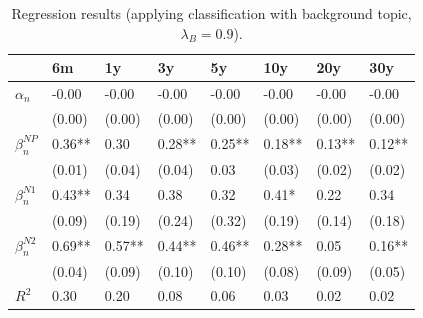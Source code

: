 \documentclass[11pt,a4paper,english,oneside]{book}
\numberwithin{equation}{chapter}
\begin{document}
\begin{table}[h] %
	\centering %
	\begin{tabular}{ p{2cm}  p{1cm} p{1cm} p{1cm} p{1cm} p{1cm} p{1cm} p{1cm} } %
		\toprule %
						& 6m 		& 1y 		& 3y 		& 5y 		& 10y 		& 20y 		& 30y \\
		\midrule %
		$\alpha_n$		& -0.00 	& -0.00 	& -0.00 	& -0.00  	& -0.00 	& -0.00 	& -0.00    \\
						& (0.00) 	& (0.00)  	& (0.00)  	& (0.00) 	& (0.00) 	& (0.00) 	& (0.00)   \\
		$\beta_n^{NP}$	&  0.36**	&   0.30	& 0.28**	&  0.25**	&  0.18**	&  0.13**	& 0.12**\\
						& (0.01)	&  (0.04)	& (0.04)	&  0.03		&  (0.03)	&  (0.02)	& (0.02) \\
		$\beta_n^{N1}$	& 0.43**	&  0.34		&  0.38		&  0.32		&  0.41*	& 0.22		& 0.34  \\
						&  (0.09)	&  (0.19)	& (0.24)	& (0.32)	&  (0.19)	& (0.14)	& (0.18)  \\
		$\beta_n^{N2}$	&  0.69**	&  0.57**	&  0.44**	&  0.46**	&  0.28**	& 0.05		& 0.16**\\
						& 	(0.04)	&  (0.09)	& (0.10)	&  (0.10)	& (0.08)	& (0.09)	& (0.05) \\
		$R^2$			&  0.30		& 0.20		& 0.08		&  0.06		&  0.03		&  0.02		&  0.02  \\
		
		\bottomrule %
	\end{tabular}
	\caption{Regression results (applying classification with background topic, $\lambda_B=0.9$).} %
	\label{tab:reg2} %
\end{table}
\end{document}
